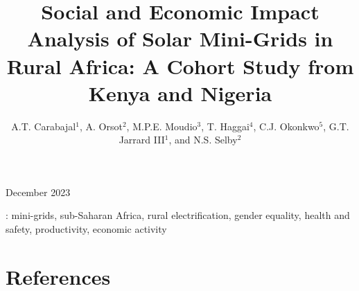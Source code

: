 \documentclass[12pt]{iopart}
\begin{document}
\title[]{Social and Economic Impact Analysis of Solar Mini-Grids in Rural Africa: A Cohort Study from Kenya and Nigeria}

\author{A.T. Carabajal$^1$, A. Orsot$^2$, M.P.E. Moudio$^3$, T. Haggai$^4$, C.J. Okonkwo$^5$, G.T. Jarrard III$^1$, and N.S. Selby$^2$}
\address{$^1$Renewvia Energy Corporation, 2951 Flowers Rd. S., Suite 217, Atlanta, GA 30341}
\address{$^2$Renewvia Solar Ethiopia PLC, Addis Ababa, Ethiopia, Bole sub-city, Woreda 03, House No. 174/175, Saya Building, 5th Floor}
\address{$^3$Department of Industrial Engineering and Operations Research, UC Berkeley, 2521 Hearst Ave, Berkeley, CA, USA, 94709}
\address{$^4$Department of Anthropology, Gender and African Studies, University of Nairobi, PR98+JC9 University Way, Nairobi}
\address{$^5$Planetary Health Management Mission Pathway, Entrepreneurial Leadership Program, Africa Leadership University Rwanda Campus,
Bumbogo, Kigali, Innovation City, Kigali, Rwanda}
\vspace{10pt}
\begin{indented}
\item[]December 2023
\end{indented}

\begin{abstract}

\end{abstract}

\vspace{2pc}
: mini-grids, sub-Saharan Africa, rural electrification, gender equality, health and safety, productivity, economic activity

%
%
\maketitle
% 
%












\section*{References}


\newpage

\end{document}
